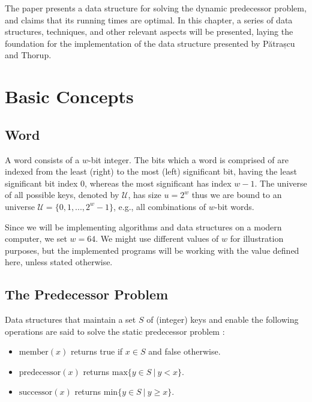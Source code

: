 The \cite{patrascu2014dynamic} paper presents a data structure for solving the dynamic predecessor problem, and claims that its running times are optimal.
In this chapter, a series of data structures, techniques, and other relevant aspects will be presented, laying the foundation for the implementation of the data structure presented by Pătrașcu and Thorup.

\section{Basic Concepts}

\subsection{Word} \label{sec:word}
A word consists of a $w$-bit integer.
The bits which a word is comprised of are indexed from the least (right) to the most (left) significant bit, having the least significant bit index $0$, whereas the most significant has index $w-1$.
The universe of all possible keys, denoted by $\mathcal U$, has size $u = 2^{w}$ thus we are bound to an universe $\mathcal U = \{0, 1, ..., 2^{w}-1\}$, e.g., all combinations of $w$-bit words.

Since we will be implementing algorithms and data structures on a modern computer, we set $w = 64$. We might use different values of $w$ for illustration purposes, but the implemented programs will be working with the value defined here, unless stated otherwise.

\subsection{The Predecessor Problem} \label{sec:predecessorProblem}
Data structures that maintain a set $S$ of (integer) keys and enable the following operations are said to solve the static predecessor problem \cite{beame1999optimal}:
\begin{itemize}
    \item
    $\text{member}(x)$ returns {\ttfamily true} if $x \in S$ and {\ttfamily false} otherwise.
    
    \item
    $\text{predecessor}(x)$ returns $\text{max}\{y\in S\ |\ y < x\}$.
    
    \item
    $\text{successor}(x)$ returns $\text{min}\{y\in S\ |\ y \geq x\}$.
\end{itemize}

